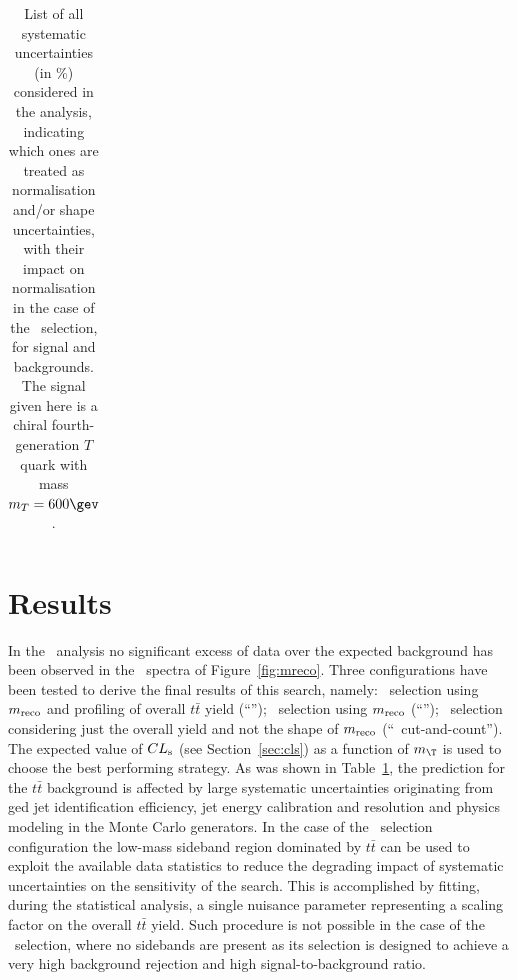\begin{table}[htb]
{\begin{tabular}{l*{3}{c}}
\bottomrule
\end{tabular}}
\caption{List of all systematic uncertainties (in \%) considered in the analysis, indicating which ones are treated
as normalisation and/or shape uncertainties, with their impact on normalisation in the case of the 
\tight\ selection, for signal and backgrounds. The signal given here is a chiral fourth-generation $T$ quark with mass $m_{T}=600\gev$.}
\label{tab:SystSummary}
\end{table}



\section{Results}\label{sec:wbxRES}


In the \wbx\ analysis no significant excess of data over the 
expected background has been observed in the \mreco\ spectra 
of Figure~\ref{fig:mreco}.
Three configurations have been tested to derive the final
results of this search, namely: \loose\ selection using $m_{\rm reco}$ and profiling of overall $t\bar{t}$ yield (``\loose''); \tight\ selection using $m_{\rm reco}$
(``\tight''); \tight\ selection  considering just the overall yield and not 
the shape of $m_{\rm reco}$ (``\tight\ cut-and-count'').
The expected value of $CL_{\rm s}$ (see Section~\ref{sec:cls})
as a function of $m_{\T}$ is
used to choose the best performing strategy.
As was shown in Table~\ref{tab:SystSummary}, the prediction for 
the $t\bar{t}$ background is affected by 
large systematic uncertainties originating from \btag ged jet 
identification efficiency, 
jet energy calibration and resolution and physics modeling in the Monte
Carlo generators. 
In the case of the \loose\ selection configuration the low-mass sideband
region dominated by $t\bar{t}$ can be used to exploit the available data 
statistics to reduce the degrading 
impact of systematic uncertainties on the sensitivity of the search. 
This is accomplished by fitting, during the statistical analysis,
a single nuisance parameter representing a scaling factor on 
the overall $t\bar{t}$ yield. Such procedure is
not possible in the case of the \tight\ selection, where no
sidebands are present as its selection is designed 
to achieve a very high background rejection and high signal-to-background ratio.

